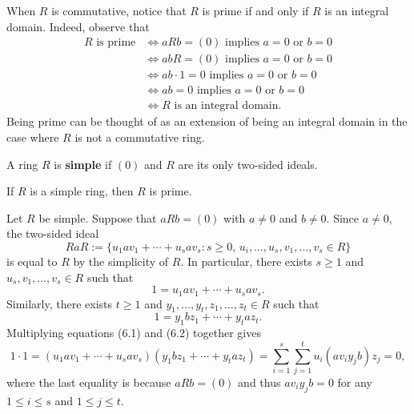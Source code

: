 When $R$ is commutative, notice that $R$ is prime if and only if $R$ is an integral domain. 
Indeed, observe that 
\begin{align*}
    R \text{ is prime} &\iff aRb = (0) \text{ implies } a = 0 \text{ or } b = 0 \\
    &\iff abR = (0) \text{ implies } a = 0 \text{ or } b = 0 \\
    &\iff ab \cdot 1 = 0 \text{ implies } a = 0 \text{ or } b = 0 \\
    &\iff ab = 0 \text{ implies } a = 0 \text{ or } b = 0 \\
    &\iff R \text{ is an integral domain.}
\end{align*}
Being prime can be thought of as an extension of being an integral domain in the case where $R$ 
is not a commutative ring. 

\begin{defn}
A ring $R$ is {\bf simple} if $(0)$ and $R$ are its only two-sided ideals.
\end{defn}

\begin{prop}
If $R$ is a simple ring, then $R$ is prime. 
\end{prop}
\begin{pf}
Let $R$ be simple. Suppose that $aRb = (0)$ with $a \neq 0$ and $b \neq 0$. Since $a \neq 0$, the 
two-sided ideal 
\[ RaR := \{u_1av_1 + \cdots + u_sav_s : s \geq 0,\, u_i, \dots, u_s, v_1, \dots, v_s \in R\} \]
is equal to $R$ by the simplicity of $R$. In particular, there exists $s \geq 1$ and 
$u_s, v_1, \dots, v_s \in R$ such that 
\begin{equation}
    1 = u_1av_1 + \cdots + u_sav_s. 
\end{equation}
Similarly, there exists $t \geq 1$ and $y_1, \dots, y_t, z_1, \dots, z_t \in R$ such that 
\begin{equation}
    1 = y_1bz_1 + \cdots + y_taz_t. 
\end{equation}
Multiplying equations (6.1) and (6.2) together gives 
\[ 1 \cdot 1 = (u_1av_1 + \cdots + u_sav_s)(y_1bz_1 + \cdots + y_taz_t) 
= \sum_{i=1}^s \sum_{j=1}^t u_i(av_iy_jb)z_j = 0, \]
where the last equality is because $aRb = (0)$ and thus $av_iy_jb = 0$ for any $1 \leq i \leq s$ 
and $1 \leq j \leq t$. 
\end{pf}

